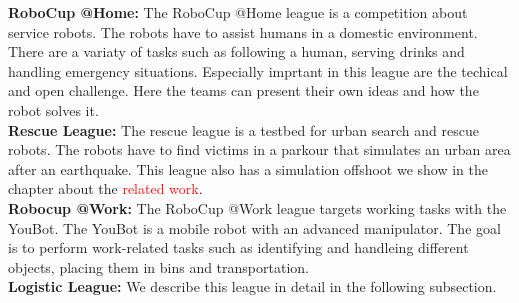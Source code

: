 \textbf{RoboCup @Home:} The RoboCup @Home league is a competition about service robots. The robots have to assist humans in a domestic environment. There are a variaty of tasks such as following a human, serving drinks and handling emergency situations. Especially imprtant in this league are the techical and open challenge. Here the teams can present their own ideas and how the robot solves it.\\
\textbf{Rescue League:} The rescue league is a testbed for urban search and rescue robots. The robots have to find victims in a parkour that simulates an urban area after an earthquake. This league also has a simulation offshoot we show in the chapter about the \textcolor{red}{related work}.\\
\textbf{Robocup @Work:} The RoboCup @Work league targets working tasks with the YouBot. The YouBot is a mobile robot with an advanced manipulator. The goal is to perform work-related tasks such as identifying and handleing different objects, placing them in bins and transportation.\\
\textbf{Logistic League:} We describe this league in detail in the following subsection.\\

